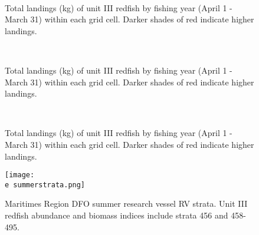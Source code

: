 \documentclass[11pt]{article}
\newcommand{\D}{.}
\newcommand{\e}{/home/ecomod_data/redfish/figures/}
\begin{document}
\begin{landscape}
\begin{figure}
\centering
{}
\\
\caption{Total landings (kg) of unit III redfish by fishing year (April 1 - March 31) within each grid cell. Darker shades of red indicate higher landings.}
\end{figure}
\clearpage

\begin{figure}
\centering
{}
\\
\caption{Total landings (kg) of unit III redfish by fishing year (April 1 - March 31) within each grid cell. Darker shades of red indicate higher landings.}
\end{figure}
\clearpage

\begin{figure}
\centering
{}
\\
\caption{Total landings (kg) of unit III redfish by fishing year (April 1 - March 31) within each grid cell. Darker shades of red indicate higher landings.}
\end{figure}
\clearpage
\end{landscape}

\begin{figure}
    
    \texttt{[image: \\e summerstrata.png]}
    \caption{Maritimes Region DFO summer research vessel RV strata. Unit III redfish abundance and biomass indices include strata 456 and 458-495.}

\end{figure}
\clearpage
\end{document}
